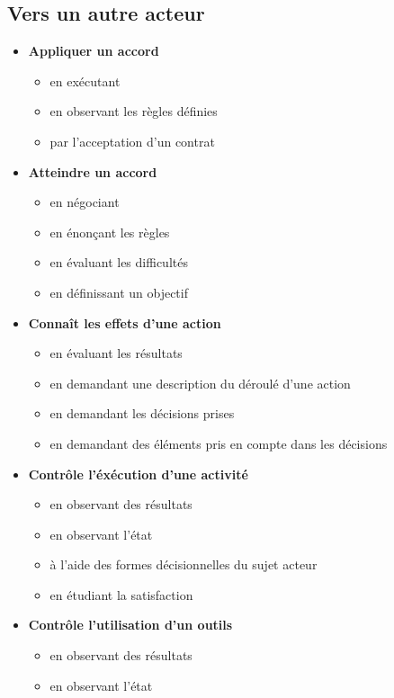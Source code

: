 \documentclass[8pt,a4paper]{article}
\begin{document}
\subsection{Vers un autre acteur}
\begin{itemize}
\item \textbf{Appliquer un accord}
\begin{itemize}
\item en exécutant
\item en observant les règles définies
\item par l'acceptation d'un contrat
\\ 
 \end{itemize}
\item \textbf{Atteindre un accord}
\begin{itemize}
\item en négociant
\item en énonçant les règles
\item en évaluant les difficultés
\item en définissant un objectif
\\ 
 \end{itemize}
\item \textbf{Connaît les effets d'une action}
\begin{itemize}
\item en évaluant les résultats
\item en demandant une description du déroulé d'une action
\item en demandant les décisions prises
\item en demandant des éléments pris en compte dans les décisions
\\ 
 \end{itemize}
\item \textbf{Contrôle l'éxécution d'une activité}
\begin{itemize}
\item en observant des résultats
\item en observant l'état
\item à l'aide des formes décisionnelles du sujet acteur
\item en étudiant la satisfaction
\\ 
 \end{itemize}
\item \textbf{Contrôle l'utilisation d'un outils}
\begin{itemize}
\item en observant des résultats
\item en observant l'état

\end{itemize}
\end{itemize}
\end{document}
